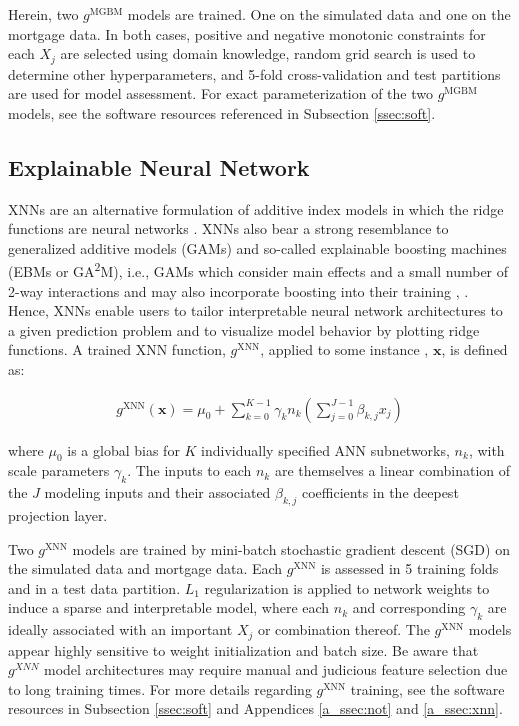 \documentclass[information,article,submit,moreauthors,pdftex]{definitions/mdpi}
\begin{document}
Herein, two $g^\text{MGBM}$ models are trained. One on the simulated data and one on the mortgage data. In both cases, positive and negative monotonic constraints for each $X_j$ are selected using domain knowledge, random grid search is used to determine other hyperparameters, and 5-fold cross-validation and test partitions are used for model assessment. For exact parameterization of the two $g^\text{MGBM}$ models, see the software resources referenced in Subsection \ref{ssec:soft}. 

\subsection{Explainable Neural Network}\label{ssec:xnn}

XNNs are an alternative formulation of additive index models in which the ridge functions are neural networks \cite{wf_xnn}. XNNs also bear a strong resemblance to generalized additive models (GAMs) and so-called explainable boosting machines (EBMs or GA\textsuperscript{2}M), i.e., GAMs which consider main effects and a small number of 2-way interactions and may also incorporate boosting into their training \cite{esl}, \cite{ga2m}.  Hence, XNNs enable users to tailor interpretable neural network architectures to a given prediction problem and to visualize model behavior by plotting ridge functions. A trained XNN function, $g^{\text{XNN}}$, applied to some instance , $\mathbf{x}$, is defined as:

\begin{equation}
\begin{aligned}
\label{eq:xnn}
g^{\text{XNN}}(\mathbf{x}) = \mu_0 + \sum_{k=0}^{K-1}\gamma_k n_k(\sum^{J-1}_{j=0}\beta_{k, j}x_j)
\end{aligned}
\end{equation}

\noindent where $\mu_0$ is a global bias for $K$ individually specified ANN subnetworks, $n_k$, with scale parameters $\gamma_k$. The inputs to each $n_k$ are themselves a linear combination of the $J$ modeling inputs and their associated $\beta_{k,j}$ coefficients in the deepest projection layer. 

Two $g^\text{XNN}$ models are trained by mini-batch stochastic gradient descent (SGD) on the simulated data and mortgage data. Each $g^\text{XNN}$ is assessed in 5 training folds and in a test data partition. $L_1$ regularization is applied to network weights to induce a sparse and interpretable model, where each $n_k$ and corresponding $\gamma_k$ are ideally associated with an important $X_j$ or combination thereof. The $g^\text{XNN}$ models appear highly sensitive to weight initialization and batch size. Be aware that $g^{XNN}$ model architectures may require manual and judicious feature selection due to long training times. For more details regarding $g^\text{XNN}$ training, see the software resources in Subsection \ref{ssec:soft} and Appendices  \ref{a_ssec:not} and \ref{a_ssec:xnn}.
\end{document}
